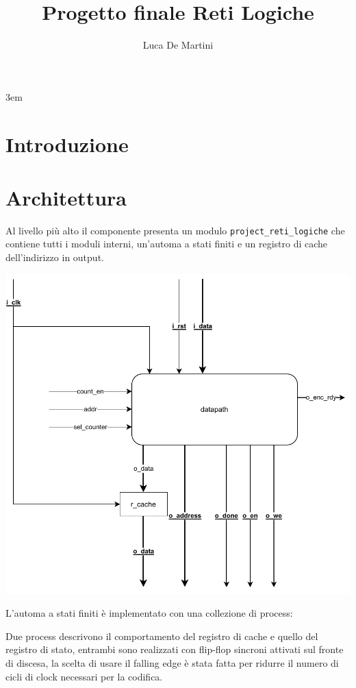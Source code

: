 \documentclass[a4paper,twocolumn]{article}
\title{Progetto finale Reti Logiche}
\author{Luca De Martini}
\date{}
\begin{document}
\setlength\parindent{0pt}
\emergencystretch 3em

\maketitle
    
\section{Introduzione}

\section{Architettura}
Al livello più alto il componente presenta un modulo \texttt{project\_reti\_logiche} che contiene tutti i moduli interni, un'automa a stati finiti e un registro di cache dell'indirizzo in output.

\includegraphics[width=\linewidth]{schema-main.pdf}

L'automa a stati finiti è implementato con una collezione di process:

Due process descrivono il comportamento del registro di cache e quello del registro di stato, entrambi sono realizzati con flip-flop sincroni attivati sul fronte di discesa, la scelta di usare il falling edge è stata fatta per ridurre il numero di cicli di clock necessari per la codifica.
\end{document}
